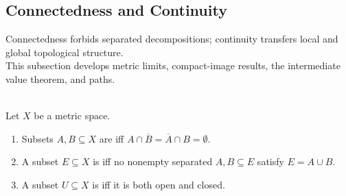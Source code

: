 \subsection{Connectedness and Continuity}\label{subsec:connectedness-and-continuity}

Connectedness forbids separated decompositions; continuity transfers local and global topological structure.\\
This subsection develops metric limits, compact-image results, the intermediate value theorem, and paths.

\begin{definition} \label{def:separated-and-connected-sets} \\
Let $X$ be a metric space.
\begin{enumerate}[label=(\roman*)]
\setlength{\itemsep}{0pt}
\item Subsets $A,B\subseteq X$ are  iff $A\cap\overline{B}=\overline{A}\cap B=\emptyset$.
\item A subset $E\subseteq X$ is  iff no nonempty separated $A,B\subseteq E$ satisfy $E=A\cup B$.
\item A subset $U\subseteq X$ is  iff it is both open and closed.
\end{enumerate}
\end{definition}

